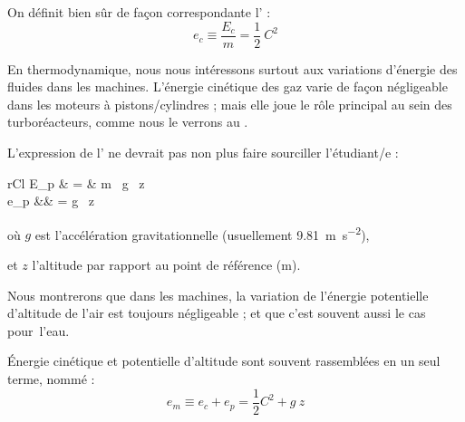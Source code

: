 	On définit bien sûr de façon correspondante l’ :
	\begin{equation}
		e_{c} \equiv \frac{E_{c}}{m} = \frac{1}{2} \ C^2
		\label{def_énergie_cinétique_spécifique}
	\end{equation}


	En thermodynamique, nous nous intéressons surtout aux variations d’énergie des fluides dans les machines. L’énergie cinétique des gaz varie de façon négligeable dans les moteurs à pistons/cylindres ; mais elle joue le rôle principal au sein des turboréacteurs, comme nous le verrons au \coursdix.

	L’expression de l’ ne devrait pas non plus faire sourciller l’étudiant/e :
	\begin{IEEEeqnarray}{rCl}
		E_p 	& = & m \ g \ z	\\
		e_p 	&\equiv&   = g \ z
		\label{eq_énergie_potentielle}
	\end{IEEEeqnarray}
	\begin{equationterms}		
		\item où \tab $g$ \tab est l’accélération gravitationnelle (usuellement \SI{9,81}{\metre\per\second\squared}),
		\item et \tab $z$ \tab l’altitude par rapport au point de référence (\si{\metre}).
	\end{equationterms}

	Nous montrerons que dans les machines, la variation de l’énergie potentielle d’altitude de l’air est toujours négligeable ; et que c’est souvent aussi le cas pour~l’eau.

	Énergie cinétique et potentielle d’altitude sont souvent rassemblées en un seul terme, nommé  :
	\begin{equation}
		e_{m} \equiv e_{c} + e_p = \frac{1}{2}C^2 + g \ z
		\label{def_énergie_mécanique_spécifique}
	\end{equation}


